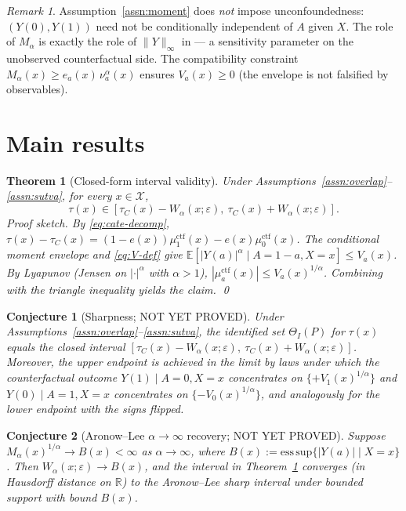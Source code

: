 \documentclass[11pt]{article}
\newcommand{\E}{\mathbb{E}}
\newcommand{\R}{\mathbb{R}}
\theoremstyle{definition}
\theoremstyle{plain}
\newtheorem{theorem}{Theorem}
\newtheorem{conjecture}{Conjecture}
\theoremstyle{remark}
\newtheorem{remark}{Remark}
\begin{document}
\begin{remark}
Assumption~\ref{assn:moment} does \emph{not} impose unconfoundedness: $(Y(0), Y(1))$
need not be conditionally independent of $A$ given $X$. The role of $M_\alpha$ is
exactly the role of $\|Y\|_\infty$ in \citet{AronowLee2013} --- a sensitivity parameter
on the unobserved counterfactual side. The compatibility constraint
$M_\alpha(x) \ge e_a(x)\,\nu_a^\alpha(x)$ ensures $V_a(x) \ge 0$ (the envelope is
not falsified by observables).
\end{remark}

\section{Main results}

\begin{theorem}[Closed-form interval validity]\label{thm:validity}
Under Assumptions~\ref{assn:overlap}--\ref{assn:sutva}, for every $x \in \mathcal{X}$,
\begin{equation*}
  \tau(x) \in [\tau_C(x) - W_\alpha(x;\varepsilon),\ \tau_C(x) + W_\alpha(x;\varepsilon)].
\end{equation*}
\emph{Proof sketch.} By \eqref{eq:cate-decomp},
$\tau(x) - \tau_C(x) = (1-e(x))\mu_1^{\mathrm{ctf}}(x) - e(x)\mu_0^{\mathrm{ctf}}(x)$.
The conditional moment envelope and \eqref{eq:V-def} give
$\E[|Y(a)|^\alpha \mid A=1{-}a, X=x] \le V_a(x)$. By Lyapunov (Jensen on $|\cdot|^\alpha$
with $\alpha>1$),
$|\mu_a^{\mathrm{ctf}}(x)| \le V_a(x)^{1/\alpha}$. Combining with the triangle inequality
yields the claim. \qed
\end{theorem}

\begin{conjecture}[Sharpness; NOT YET PROVED]\label{conj:sharp}
Under Assumptions~\ref{assn:overlap}--\ref{assn:sutva}, the identified set $\Theta_I(P)$
for $\tau(x)$ equals the closed interval
$[\tau_C(x) - W_\alpha(x;\varepsilon),\ \tau_C(x) + W_\alpha(x;\varepsilon)]$.
Moreover, the upper endpoint is achieved in the limit by laws under which the
counterfactual outcome $Y(1) \mid A=0, X=x$ concentrates on $\{+V_1(x)^{1/\alpha}\}$
and $Y(0) \mid A=1, X=x$ concentrates on $\{-V_0(x)^{1/\alpha}\}$, and analogously
for the lower endpoint with the signs flipped.
\end{conjecture}

\begin{conjecture}[Aronow--Lee $\alpha\to\infty$ recovery; NOT YET PROVED]\label{conj:limit}
Suppose $M_\alpha(x)^{1/\alpha} \to B(x) < \infty$ as $\alpha\to\infty$, where
$B(x) := \mathrm{ess\,sup}\{|Y(a)| \mid X=x\}$. Then
$W_\alpha(x;\varepsilon) \to B(x)$, and the interval in Theorem~\ref{thm:validity}
converges (in Hausdorff distance on $\R$) to the Aronow--Lee sharp interval under
bounded support with bound $B(x)$.
\end{conjecture}
\end{document}
